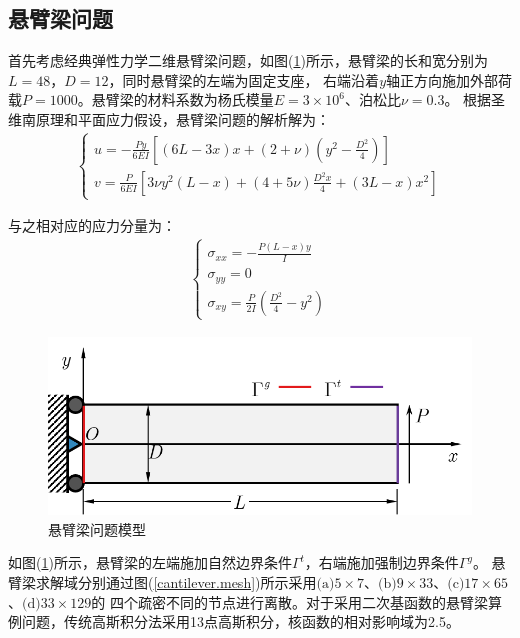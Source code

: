 \subsection{悬臂梁问题}
首先考虑经典弹性力学二维悬臂梁问题，如图(\ref{cantilever})所示，悬臂梁的长和宽分别为$L=48$，$D=12$，同时悬臂梁的左端为固定支座，
右端沿着$y$轴正方向施加外部荷载$P=1000$。悬臂梁的材料系数为杨氏模量$E=3\times10^6$、泊松比$\nu=0.3$。
根据圣维南原理和平面应力假设，悬臂梁问题的解析解为：
\begin{equation}
\begin{split}
\begin{cases}
    u = -\frac{Py}{6EI}[(6L-3x)x + (2+\nu)(y^2 - \frac{D^2}{4})] \\
    v = \frac{P}{6EI}[3\nu y^2(L-x) + (4+5\nu)\frac{D^2x}{4} + (3L-x)x^2]
\end{cases}
\end{split}
\end{equation}\par
与之相对应的应力分量为：
\begin{equation}
\begin{split}
\begin{cases}
   \sigma_{xx}=-\frac{P(L-x)y}{I}\\
   \sigma_{yy}=0\\
   \sigma_{xy}=\frac{P}{2I}(\frac{D^2}{4}-y^2)
\end{cases}
\end{split}
\end{equation}
\begin{figure}[H]
    \centering
    \includegraphics[scale=0.7]{figure/EHR/cantilever/cantilever.png}
    \caption{悬臂梁问题模型}\label{cantilever}
\end{figure}
如图(\ref{cantilever})所示，悬臂梁的左端施加自然边界条件$\Gamma^t$，右端施加强制边界条件$\Gamma^g$。
悬臂梁求解域分别通过图(\ref{cantilever.mesh})所示采用$\text{(a)}5\times7$、$\text{(b)}9\times33$、$\text{(c)}17\times65$、$\text{(d)}33\times129$的
四个疏密不同的节点进行离散。对于采用二次基函数的悬臂梁算例问题，传统高斯积分法采用13点高斯积分，核函数的相对影响域为2.5。
